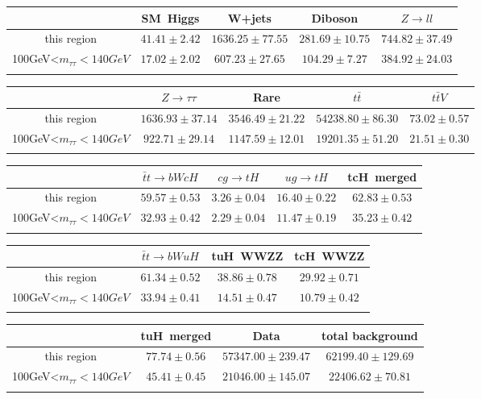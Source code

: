 \centering
\begin{tabular}{ccccc} \toprule\toprule
 & SM~Higgs & W+jets & Diboson & $Z\to ll$\\\midrule
this region & $41.41\pm2.42$ & $1636.25\pm77.55$ & $281.69\pm10.75$ & $744.82\pm37.49$\\
100GeV<$m_{\tau\tau}<140GeV$ & $17.02\pm2.02$ & $607.23\pm27.65$ & $104.29\pm7.27$ & $384.92\pm24.03$\\
\bottomrule\bottomrule\\
\end{tabular}
\begin{tabular}{ccccc} \toprule\toprule
 & $Z\to \tau\tau$ & Rare & $t\bar{t}$ & $t\bar{t}V$\\\midrule
this region & $1636.93\pm37.14$ & $3546.49\pm21.22$ & $54238.80\pm86.30$ & $73.02\pm0.57$\\
100GeV<$m_{\tau\tau}<140GeV$ & $922.71\pm29.14$ & $1147.59\pm12.01$ & $19201.35\pm51.20$ & $21.51\pm0.30$\\
\bottomrule\bottomrule\\
\end{tabular}
\begin{tabular}{ccccc} \toprule\toprule
 & $\bar{t}t\to bWcH$ & $cg\to tH$ & $ug\to tH$ & tcH~merged\\\midrule
this region & $59.57\pm0.53$ & $3.26\pm0.04$ & $16.40\pm0.22$ & $62.83\pm0.53$\\
100GeV<$m_{\tau\tau}<140GeV$ & $32.93\pm0.42$ & $2.29\pm0.04$ & $11.47\pm0.19$ & $35.23\pm0.42$\\
\bottomrule\bottomrule\\
\end{tabular}
\begin{tabular}{cccc} \toprule\toprule
 & $\bar{t}t\to bWuH$ & tuH~WWZZ & tcH~WWZZ\\\midrule
this region & $61.34\pm0.52$ & $38.86\pm0.78$ & $29.92\pm0.71$\\
100GeV<$m_{\tau\tau}<140GeV$ & $33.94\pm0.41$ & $14.51\pm0.47$ & $10.79\pm0.42$\\
\bottomrule\bottomrule\\
\end{tabular}
\begin{tabular}{cccc} \toprule\toprule
 & tuH~merged & Data & total background\\\midrule
this region & $77.74\pm0.56$ & $57347.00\pm239.47$ & $62199.40\pm129.69$\\
100GeV<$m_{\tau\tau}<140GeV$ & $45.41\pm0.45$ & $21046.00\pm145.07$ & $22406.62\pm70.81$\\
\bottomrule\bottomrule\\
\end{tabular}
